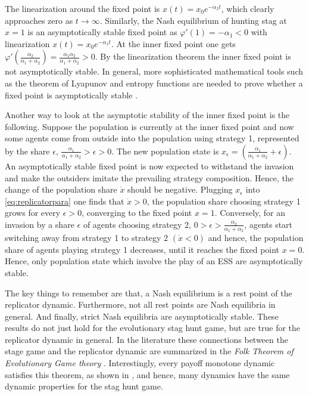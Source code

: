 The linearization around the fixed point is $x(t) = x_0 e^{-\alpha_2 t}$, 
which clearly approaches zero as $t \rightarrow \infty$. 
Similarly, the Nash equilibrium 
of hunting stag at $x=1$ is an asymptotically stable fixed point as
$\varphi'(1) = -\alpha_1 <0$ with linearization $x(t) = x_0 e^{-\alpha_1 t}$.
At the inner fixed point one gets 
$\varphi'(\frac{\alpha_2}{\alpha_1+\alpha_2}) = 
\frac{\alpha_1 \alpha_2}{\alpha_1+\alpha_2} >0$. By the linearization theorem
the inner fixed point is not asymptotically stable.
In general, more sophisticated mathematical tools such as the theorem of 
Lyapunov and entropy functions are needed to prove whether a fixed point
is asymptotically stable \parencite{friedman_economic_1998}.

Another way to look at the asymptotic stability of the inner fixed
point is the following.
Suppose the population is currently at the inner fixed point and now 
some agents come from outside into the population
using strategy 1, represented by the share $\epsilon$,
$\frac{\alpha_1}{\alpha_1+\alpha_2}>\epsilon > 0$.
The new population state is 
$x_{\epsilon}=\left(\frac{\alpha_1}{\alpha_1+\alpha_2} + \epsilon\right)$.
An asymptotically stable fixed point is now expected to withstand the invasion
and make the outsiders imitate the prevailing strategy composition. Hence, 
the change of the population share $\dot{x}$ should be negative.
Plugging $x_{\epsilon}$ into
\eqref{eq:replicatorpara} one finds that $\dot{x} >0$, the population share
choosing strategy 1 grows for every $\epsilon >0$, converging to the 
fixed point $x = 1$. Conversely, for an invasion by a share $\epsilon$ 
of agents
choosing strategy 2, $0 > \epsilon > \frac{\alpha_2}{\alpha_1+\alpha_2}$,
agents start switching away from strategy 1 to strategy 2 $(\dot{x} < 0)$ 
and hence, the population share of agents playing strategy 1 
decreases, until it reaches the 
fixed point $x=0$. 
Hence, only population state which involve the play of an ESS are asymptotically 
stable.

The key things to remember are that, a Nash equilibrium is a rest point of
the replicator dynamic. Furthermore, not all rest points are 
Nash equilibria in general. And finally, strict Nash equilibria 
are asymptotically stable. These results do not just hold for
the evolutionary stag hunt game, but are true for the replicator dynamic
in general. In the literature these connections between the stage game
and the replicator dynamic are summarized in the
\textit{Folk Theorem of Evolutionary Game theory} 
\parencite[25]{szabo_evolutionary_2007}. Interestingly, every payoff
monotone dynamic satisfies this theorem, as shown in 
\textcite{hofbauer_evolutionary_2003}, and hence, many dynamics have the same
dynamic properties for the stag hunt game. 

